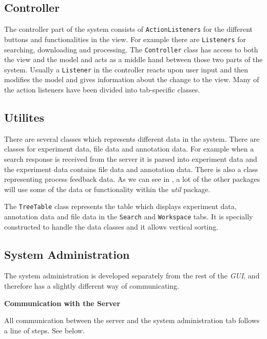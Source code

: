 \subsection{Controller}
The controller part of the system consists of \texttt{ActionListeners} for the different buttons and functionalities in the view. For example there are \texttt{Listeners} for searching, downloading and processing. The \texttt{Controller} class has access to both the view and the model and acts as a middle hand between those two parts of the system. Usually a \texttt{Listener} in the controller reacts upon user input and then modifies the model and gives information about the change to the view. Many of the action listeners have been divided into tab-specific classes.


\subsection{Utilites}

There are several classes which represents different data in the system. There are classes for experiment data, file data and annotation data. For example when a search response is received from the server it is parsed into experiment data and the experiment data contains file data and annotation data. There is also a class representing process feedback data. As we can see in ,  a lot of the other packages will use some of the data or functionality within the \textit{util} package.

The \texttt{TreeTable} class represents the table which displays experiment data, annotation data and file data in the \texttt{Search} and \texttt{Workspace} tabs. It is specially constructed to handle the data classes and it allows vertical sorting.

\subsection{System Administration}
The system administration is developed separately from the rest of the \textit{GUI}, and therefore has a slightly different way of communicating.

\textbf{Communication with the Server}


All communication between the server and the system administration tab follows a line of steps. See  below.

